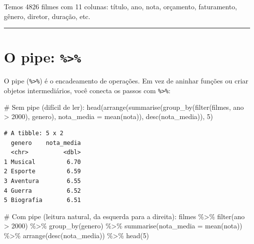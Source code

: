 \documentclass[
  letterpaper,
]{scrbook}
\newenvironment{Shaded}{\begin{snugshade}}{\end{snugshade}}
\newcommand{\AttributeTok}[1]{\textcolor[rgb]{0.40,0.45,0.13}{#1}}
\newcommand{\CommentTok}[1]{\textcolor[rgb]{0.37,0.37,0.37}{#1}}
\newcommand{\DecValTok}[1]{\textcolor[rgb]{0.68,0.00,0.00}{#1}}
\newcommand{\FunctionTok}[1]{\textcolor[rgb]{0.28,0.35,0.67}{#1}}
\newcommand{\NormalTok}[1]{\textcolor[rgb]{0.00,0.23,0.31}{#1}}
\newcommand{\SpecialCharTok}[1]{\textcolor[rgb]{0.37,0.37,0.37}{#1}}
\begin{document}
Temos 4826 filmes com 11 colunas: título, ano, nota, orçamento,
faturamento, gênero, diretor, duração, etc.

\begin{center}\rule{0.5\linewidth}{0.5pt}\end{center}

\section{\texorpdfstring{O pipe:
\texttt{\%\textgreater{}\%}}{O pipe: \%\textgreater\%}}\label{o-pipe-1}

O pipe (\texttt{\%\textgreater{}\%}) é o encadeamento de operações. Em
vez de aninhar funções ou criar objetos intermediários, você conecta os
passos com \texttt{\%\textgreater{}\%}:

\begin{Shaded}
\begin{Highlighting}[]
\CommentTok{\# Sem pipe (difícil de ler):}
\FunctionTok{head}\NormalTok{(}\FunctionTok{arrange}\NormalTok{(}\FunctionTok{summarise}\NormalTok{(}\FunctionTok{group\_by}\NormalTok{(}\FunctionTok{filter}\NormalTok{(filmes, ano }\SpecialCharTok{\textgreater{}} \DecValTok{2000}\NormalTok{), genero), }\AttributeTok{nota\_media =} \FunctionTok{mean}\NormalTok{(nota)), }\FunctionTok{desc}\NormalTok{(nota\_media)), }\DecValTok{5}\NormalTok{)}
\end{Highlighting}
\end{Shaded}

\begin{verbatim}
# A tibble: 5 x 2
  genero    nota_media
  <chr>          <dbl>
1 Musical         6.70
2 Esporte         6.59
3 Aventura        6.55
4 Guerra          6.52
5 Biografia       6.51
\end{verbatim}

\begin{Shaded}
\begin{Highlighting}[]
\CommentTok{\# Com pipe (leitura natural, da esquerda para a direita):}
\NormalTok{filmes }\SpecialCharTok{\%\textgreater{}\%} 
  \FunctionTok{filter}\NormalTok{(ano }\SpecialCharTok{\textgreater{}} \DecValTok{2000}\NormalTok{) }\SpecialCharTok{\%\textgreater{}\%} 
  \FunctionTok{group\_by}\NormalTok{(genero) }\SpecialCharTok{\%\textgreater{}\%} 
  \FunctionTok{summarise}\NormalTok{(}\AttributeTok{nota\_media =} \FunctionTok{mean}\NormalTok{(nota)) }\SpecialCharTok{\%\textgreater{}\%} 
  \FunctionTok{arrange}\NormalTok{(}\FunctionTok{desc}\NormalTok{(nota\_media)) }\SpecialCharTok{\%\textgreater{}\%} 
  \FunctionTok{head}\NormalTok{(}\DecValTok{5}\NormalTok{)}
\end{Highlighting}
\end{Shaded}
\end{document}
